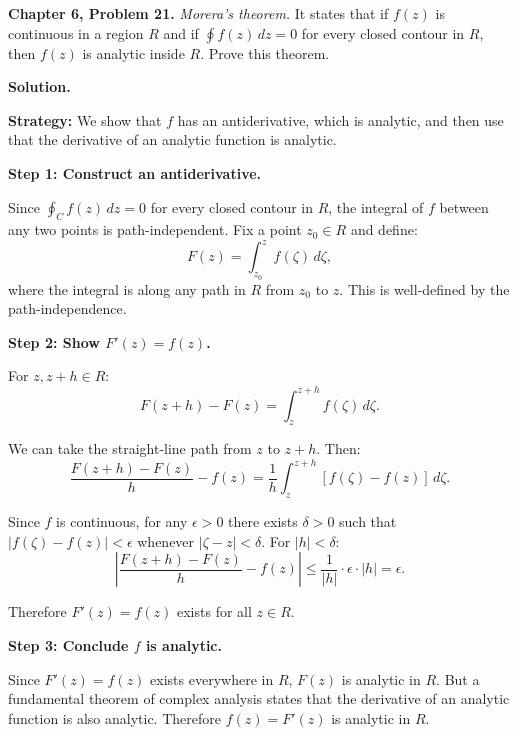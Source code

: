 \documentclass[12pt]{article}
\begin{document}
\textbf{Chapter 6, Problem 21.} \textit{Morera's theorem.} It states that if $f(z)$ is continuous in a region $R$ and if $\oint f(z)\,dz = 0$ for every closed contour in $R$, then $f(z)$ is analytic inside $R$. Prove this theorem.

\bigskip
\textbf{Solution.}

\textbf{Strategy:} We show that $f$ has an antiderivative, which is analytic, and then use that the derivative of an analytic function is analytic.

\textbf{Step 1: Construct an antiderivative.}

Since $\oint_C f(z)\,dz = 0$ for every closed contour in $R$, the integral of $f$ between any two points is path-independent. Fix a point $z_0 \in R$ and define:
\[
F(z) = \int_{z_0}^{z} f(\zeta)\,d\zeta,
\]
where the integral is along any path in $R$ from $z_0$ to $z$. This is well-defined by the path-independence.

\textbf{Step 2: Show $F'(z) = f(z)$.}

For $z, z+h \in R$:
\[
F(z+h) - F(z) = \int_z^{z+h} f(\zeta)\,d\zeta.
\]

We can take the straight-line path from $z$ to $z+h$. Then:
\[
\frac{F(z+h)-F(z)}{h} - f(z) = \frac{1}{h}\int_z^{z+h}[f(\zeta)-f(z)]\,d\zeta.
\]

Since $f$ is continuous, for any $\epsilon > 0$ there exists $\delta > 0$ such that $|f(\zeta)-f(z)| < \epsilon$ whenever $|\zeta - z| < \delta$. For $|h| < \delta$:
\[
\left|\frac{F(z+h)-F(z)}{h} - f(z)\right| \leq \frac{1}{|h|}\cdot\epsilon\cdot|h| = \epsilon.
\]

Therefore $F'(z) = f(z)$ exists for all $z \in R$.

\textbf{Step 3: Conclude $f$ is analytic.}

Since $F'(z) = f(z)$ exists everywhere in $R$, $F(z)$ is analytic in $R$. But a fundamental theorem of complex analysis states that the derivative of an analytic function is also analytic. Therefore $f(z) = F'(z)$ is analytic in $R$.
\end{document}
